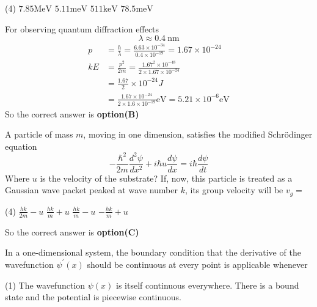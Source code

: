 \begin{questions}
\begin{minipage}{\textwidth}
\end{minipage}
\begin{tasks}(4)
	\task[\textbf{A.}] $7.85 \mathrm{MeV}$
	\task[\textbf{B.}] $5.11 \mathrm{meV}$
	\task[\textbf{C.}]   $511 \mathrm{keV}$
	\task[\textbf{D.}] $78.5 \mathrm{meV}$
\end{tasks}
\begin{answer}
	For observing quantum diffraction effects
	$$
	\lambda \approx 0.4 \mathrm{~nm}
	$$
	$$
	\begin{aligned}
	p &=\frac{h}{\lambda}=\frac{6.63 \times 10^{-34}}{0.4 \times 10^{-19}}=1.67 \times 10^{-24} \\
	k E &=\frac{p^{2}}{2 m}=\frac{1.67^{2} \times 10^{-48}}{2 \times 1.67 \times 10^{-24}} \\
	&=\frac{1.67}{2} \times 10^{-24} J \\
	&=\frac{1.67 \times 10^{-24}}{2 \times 1.6 \times 10^{-19}} \mathrm{eV}=5.21 \times 10^{-6} \mathrm{eV}
	\end{aligned}
	$$
	So the correct answer is \textbf{option(B)}
\end{answer}
\begin{minipage}{\textwidth}
	\question A particle of mass $m$, moving in one dimension, satisfies the modified Schrödinger equation
	$$
	-\frac{\hbar^{2}}{2 m} \frac{d^{2} \psi}{d x^{2}}+i \hbar u \frac{d \psi}{d x}=i \hbar \frac{d \psi}{d t}
	$$
	Where $u$ is the velocity of the substrate? If, now, this particle is treated as a Gaussian wave packet peaked at wave number $k$, its group velocity will be $v_{g}=$
\end{minipage}
\begin{tasks}(4)
	\task[\textbf{A.}] $\frac{h k}{2 m}-u$
	\task[\textbf{B.}]   $\frac{h k}{m}+u$
	\task[\textbf{C.}] $\frac{h k}{m}-u$
	\task[\textbf{D.}]   $-\frac{h k}{m}+u$
\end{tasks}
\begin{answer}
	So the correct answer is \textbf{option(C)}
\end{answer}
\begin{minipage}{\textwidth}
	\question In a one-dimensional system, the boundary condition that the derivative of the wavefunction $\psi^{\prime}(x)$ should be continuous at every point is applicable whenever
\end{minipage}
\begin{tasks}(1)
	\task[\textbf{A.}] The wavefunction $\psi(x)$ is itself continuous everywhere.
	\task[\textbf{B.}] There is a bound state and the potential is piecewise continuous.

\end{tasks}
\end{questions}
